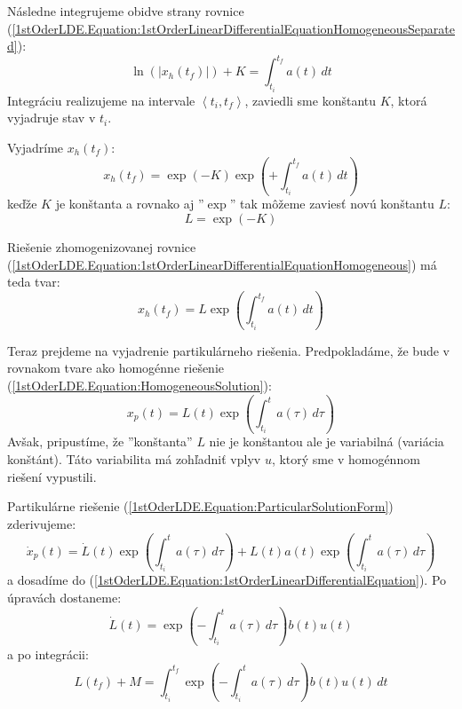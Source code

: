 \documentclass[a4paper, 10pt, ]{article}
\begin{document}
\noindent Následne integrujeme obidve strany rovnice (\ref{1stOderLDE.Equation:1stOrderLinearDifferentialEquationHomogeneousSeparated}):
\begin{equation}
    \label{1stOrderLDE.Equation:HomogeneousIntegral}
    \ln \left( |x_h(t_f)| \right) + K = \int_{t_i}^{t_f} a(t) \, dt
\end{equation}
Integráciu realizujeme na intervale $\left< t_i, t_f \right>$, zaviedli sme konštantu $K$, ktorá vyjadruje stav v $t_i$.

Vyjadríme $x_h(t_f)$:
\begin{equation}
    x_h(t_f) = \exp(-K) \exp \left( + \int_{t_i}^{t_f} a(t) \, dt \right)
\end{equation}
keďže $K$ je konštanta a rovnako aj ''$\exp$'' tak môžeme zaviesť novú konštantu $L$:
\begin{equation}
    L = \exp(-K)
\end{equation}

Riešenie zhomogenizovanej rovnice (\ref{1stOderLDE.Equation:1stOrderLinearDifferentialEquationHomogeneous}) má teda tvar:
\begin{equation}
    \label{1stOderLDE.Equation:HomogeneousSolution}
    x_h(t_f) = L \exp \left( \int_{t_i}^{t_f} a(t) \, dt \right)
\end{equation}

Teraz prejdeme na vyjadrenie partikulárneho riešenia. Predpokladáme, že bude v rovnakom tvare ako homogénne riešenie (\ref{1stOderLDE.Equation:HomogeneousSolution}):
\begin{equation}
    \label{1stOderLDE.Equation:ParticularSolutionForm}
    x_p(t) = L(t) \exp \left( \int_{t_i}^{t} a(\tau) \, d\tau \right)
\end{equation}
Avšak, pripustíme, že ''konštanta'' $L$ nie je konštantou ale je variabilná (variácia konštánt). Táto variabilita má zohľadniť vplyv $u$, ktorý sme v homogénnom riešení vypustili.

Partikulárne riešenie (\ref{1stOderLDE.Equation:ParticularSolutionForm}) zderivujeme:
\begin{equation}
    \dot{x}_p(t) = 
    \dot{L}(t) \exp \left( \int_{t_i}^{t} a(\tau) \, d\tau \right) + 
    L(t) a(t) \exp \left( \int_{t_i}^{t} a(\tau) \, d\tau \right)
\end{equation}
a dosadíme do (\ref{1stOderLDE.Equation:1stOrderLinearDifferentialEquation}). Po úpravách dostaneme:
\begin{equation}
    \dot{L}(t)  = 
    \exp \left( -\int_{t_i}^{t} a(\tau) \, d\tau \right) b(t) u(t)
\end{equation}
a po integrácii:
\begin{equation}
    \label{1stOderLDE.Equation:ConstantVariation}
    L(t_f) + M = \int_{t_i}^{t_f} \exp \left( -\int_{t_i}^{t} a(\tau) \, d\tau \right) b(t) u(t) \, dt
\end{equation}
\end{document}
